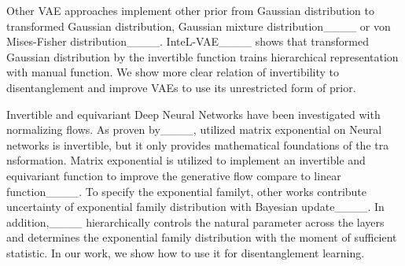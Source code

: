 Other VAE approaches implement other prior from Gaussian distribution to transformed Gaussian distribution, Gaussian mixture distribution____ or von Mises-Fisher distribution____.
InteL-VAE____ shows that transformed Gaussian distribution by the invertible function trains hierarchical representation with manual function.
We show more clear relation of invertibility to disentanglement and improve VAEs to use its unrestricted form of prior.


Invertible and equivariant Deep Neural Networks have been investigated with normalizing flows.
As proven by____, utilized matrix exponential on Neural networks is invertible, but it only provides mathematical foundations of the tra
nsformation.
Matrix exponential is utilized to implement an invertible and equivariant function to improve the generative flow compare to linear function____.
To specify the exponential familyt, other works contribute uncertainty of exponential family distribution with Bayesian update____. In addition,____ hierarchically controls the natural parameter across the layers and determines the exponential family distribution with the moment of sufficient statistic.
In our work, we show how to use it for disentanglement learning.



